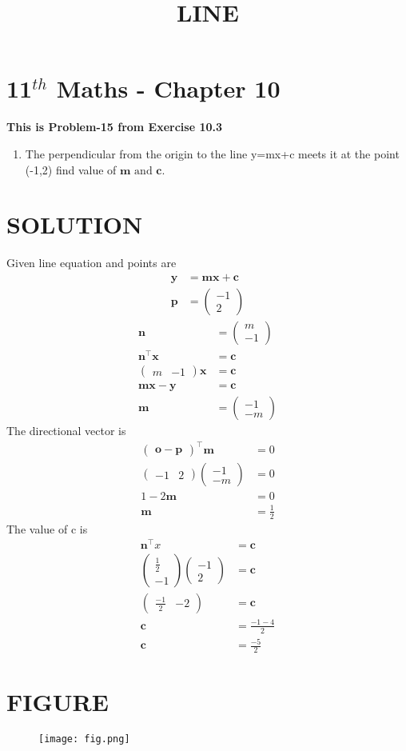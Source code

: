 \documentclass[12pt]{article}
\newcommand{\myvec}[1]{\ensuremath{\begin{pmatrix}#1\end{pmatrix}}}
\let\vec\mathbf
\begin{document}
\begin{center}
\title{\textbf{LINE}}
\date{\vspace{-5ex}} %
\maketitle
\end{center}
\section{11$^{th}$ Maths - Chapter 10}
\textbf{This is Problem-15 from Exercise 10.3}
\begin{enumerate}
\item The perpendicular from the origin to the line y=mx+c meets it at the point (-1,2) find value of $\vec{m}\text{ and }\vec{c}$.
\end{enumerate}
\section{SOLUTION}
Given line equation and points are
\begin{align}
\vec{y}&=\vec{m}\vec{x}+\vec{c}\\
\vec{p}&=\myvec{-1\\2}
\end{align}
\begin{align}
\vec{n}&=\myvec{m\\-1}\\
\vec{n}^{\top}\vec{x}&=\vec{c}\\
\myvec{m&-1}\vec{x}&=\vec{c}\\
\vec{m}\vec{x}-\vec{y}&=\vec{c}\\
\vec{m}&=\myvec{-1\\-m}
\end{align}
The directional vector is 
\begin{align}
\myvec{\vec{o}-\vec{p}}^{\top}\vec{m}&=0\\
\myvec{-1&2}\myvec{-1\\-m}&=0\\
1-2\vec{m}&=0\\
\vec{m}&=\frac{1}{2}
\end{align}
The value of c is
\begin{align}
\vec{n}^{\top}x&=\vec{c}\\
\myvec{\frac{1}{2}\\-1}\myvec{-1\\2}&=\vec{c}\\
\myvec{\frac{-1}{2}&-2}&=\vec{c}\\
\vec{c}&=\frac{-1-4}{2}\\
\vec{c}&=\frac{-5}{2}
\end{align}
\section{FIGURE}
\begin{figure}[h!]
\centering
\texttt{[image: fig.png]}
\caption{}
  \label{fig:Figure}
\end{figure}
\end{document}
